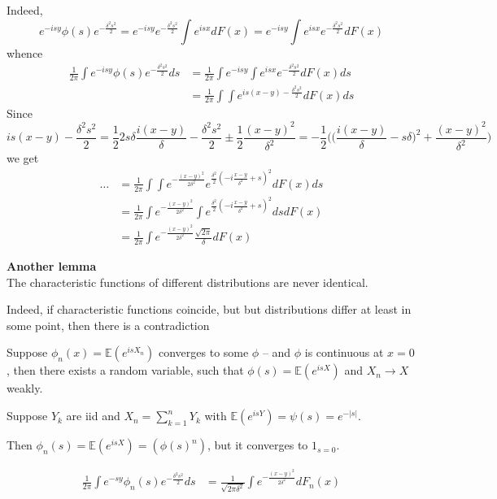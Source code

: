 \documentclass[a4paper]{article}
\newcommand{\brac}[1]{{\left ( #1 \right )}}
\newcommand{\abs}[1]{{\left | #1 \right |}}
\newcommand{\Ex}{\mathbb{E}}
\begin{document}
Indeed,
\[e^{-isy}\phi(s)e^{-\frac{\delta^2 s^2}{2}}
= e^{-isy} e^{-\frac{\delta^2 s^2}{2}}\int e^{isx} dF(x)
 = e^{-isy}\int e^{isx} e^{-\frac{\delta^2 s^2}{2}} dF(x)\]
whence
\begin{align*}
	\frac{1}{2\pi} \int e^{-isy}\phi(s)e^{-\frac{\delta^2 s^2}{2}} ds
	&= \frac{1}{2\pi} \int e^{-isy} \int e^{isx} e^{-\frac{\delta^2 s^2}{2}} dF(x) ds\\
	&= \frac{1}{2\pi} \int \int e^{is(x-y)-\frac{\delta^2 s^2}{2}} dF(x) ds
\end{align*}
Since
\[is(x-y)-\frac{\delta^2 s^2}{2}
= \frac{1}{2}2s\delta \frac{i(x-y)}{\delta}-\frac{\delta^2 s^2}{2} \pm \frac{1}{2}\frac{(x-y)^2}{\delta^2}
= -\frac{1}{2}\Big( \big( \frac{i(x-y)}{\delta} - s\delta \big)^2 + \frac{(x-y)^2}{\delta^2} \Big)
\]
we get
\begin{align*}
	\ldots
	&= \frac{1}{2\pi} \int \int e^{-\frac{{(x-y)}^2}{2\delta^2}} e^{\frac{\delta^2}{2}\brac{-i\frac{x-y}{\delta^2}+s}^2} dF(x) ds\\
	&= \frac{1}{2\pi} \int e^{-\frac{{(x-y)}^2}{2\delta^2}} \int e^{\frac{\delta^2}{2}\brac{-i\frac{x-y}{\delta^2}+s}^2} ds dF(x)\\
	&= \frac{1}{2\pi} \int e^{-\frac{{(x-y)}^2}{2\delta^2}} \frac{\sqrt{2\pi}}{\delta} dF(x)
\end{align*}

\noindent\textbf{Another lemma}\hfill\\
\noindent The characteristic functions of different distributions are never identical.

Indeed, if characteristic functions coincide, but but distributions differ at least in some point, then there is a contradiction

Suppose $\phi_n(x) = \Ex\brac{e^{isX_n}}$ converges to some $\phi$ -- and $\phi$ is continuous at $x=0$, then there exists a random variable, such that $\phi(s) = \Ex\brac{e^{isX}}$ and $X_n\to X$ weakly.

Suppose $Y_k$ are iid and $X_n = \sum_{k=1}^n Y_k$ with $\Ex\brac{e^{isY}} = \psi(s) = e^{-\abs{s}}$.

Then $\phi_n(s) = \Ex\brac{e^{isX}} = \brac{\phi(s)^n}$, but it converges to $1_{s=0}$.


\begin{align*}
	\frac{1}{2\pi}\int e^{-sy} \phi_n(s) e^{-\frac{\delta^2 s^2}{2}}ds
	& = \frac{1}{\sqrt{2\pi\delta^2}}\int e^{-\frac{{(x-y)}^2}{2\delta^2}}dF_n(x)
\end{align*}
\end{document}
